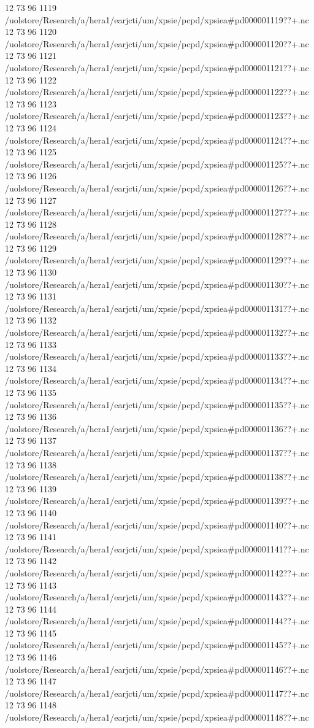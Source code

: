 12 73 96
1119
/uolstore/Research/a/hera1/earjcti/um/xpsie/pcpd/xpsiea#pd000001119??+.nc
12 73 96
1120
/uolstore/Research/a/hera1/earjcti/um/xpsie/pcpd/xpsiea#pd000001120??+.nc
12 73 96
1121
/uolstore/Research/a/hera1/earjcti/um/xpsie/pcpd/xpsiea#pd000001121??+.nc
12 73 96
1122
/uolstore/Research/a/hera1/earjcti/um/xpsie/pcpd/xpsiea#pd000001122??+.nc
12 73 96
1123
/uolstore/Research/a/hera1/earjcti/um/xpsie/pcpd/xpsiea#pd000001123??+.nc
12 73 96
1124
/uolstore/Research/a/hera1/earjcti/um/xpsie/pcpd/xpsiea#pd000001124??+.nc
12 73 96
1125
/uolstore/Research/a/hera1/earjcti/um/xpsie/pcpd/xpsiea#pd000001125??+.nc
12 73 96
1126
/uolstore/Research/a/hera1/earjcti/um/xpsie/pcpd/xpsiea#pd000001126??+.nc
12 73 96
1127
/uolstore/Research/a/hera1/earjcti/um/xpsie/pcpd/xpsiea#pd000001127??+.nc
12 73 96
1128
/uolstore/Research/a/hera1/earjcti/um/xpsie/pcpd/xpsiea#pd000001128??+.nc
12 73 96
1129
/uolstore/Research/a/hera1/earjcti/um/xpsie/pcpd/xpsiea#pd000001129??+.nc
12 73 96
1130
/uolstore/Research/a/hera1/earjcti/um/xpsie/pcpd/xpsiea#pd000001130??+.nc
12 73 96
1131
/uolstore/Research/a/hera1/earjcti/um/xpsie/pcpd/xpsiea#pd000001131??+.nc
12 73 96
1132
/uolstore/Research/a/hera1/earjcti/um/xpsie/pcpd/xpsiea#pd000001132??+.nc
12 73 96
1133
/uolstore/Research/a/hera1/earjcti/um/xpsie/pcpd/xpsiea#pd000001133??+.nc
12 73 96
1134
/uolstore/Research/a/hera1/earjcti/um/xpsie/pcpd/xpsiea#pd000001134??+.nc
12 73 96
1135
/uolstore/Research/a/hera1/earjcti/um/xpsie/pcpd/xpsiea#pd000001135??+.nc
12 73 96
1136
/uolstore/Research/a/hera1/earjcti/um/xpsie/pcpd/xpsiea#pd000001136??+.nc
12 73 96
1137
/uolstore/Research/a/hera1/earjcti/um/xpsie/pcpd/xpsiea#pd000001137??+.nc
12 73 96
1138
/uolstore/Research/a/hera1/earjcti/um/xpsie/pcpd/xpsiea#pd000001138??+.nc
12 73 96
1139
/uolstore/Research/a/hera1/earjcti/um/xpsie/pcpd/xpsiea#pd000001139??+.nc
12 73 96
1140
/uolstore/Research/a/hera1/earjcti/um/xpsie/pcpd/xpsiea#pd000001140??+.nc
12 73 96
1141
/uolstore/Research/a/hera1/earjcti/um/xpsie/pcpd/xpsiea#pd000001141??+.nc
12 73 96
1142
/uolstore/Research/a/hera1/earjcti/um/xpsie/pcpd/xpsiea#pd000001142??+.nc
12 73 96
1143
/uolstore/Research/a/hera1/earjcti/um/xpsie/pcpd/xpsiea#pd000001143??+.nc
12 73 96
1144
/uolstore/Research/a/hera1/earjcti/um/xpsie/pcpd/xpsiea#pd000001144??+.nc
12 73 96
1145
/uolstore/Research/a/hera1/earjcti/um/xpsie/pcpd/xpsiea#pd000001145??+.nc
12 73 96
1146
/uolstore/Research/a/hera1/earjcti/um/xpsie/pcpd/xpsiea#pd000001146??+.nc
12 73 96
1147
/uolstore/Research/a/hera1/earjcti/um/xpsie/pcpd/xpsiea#pd000001147??+.nc
12 73 96
1148
/uolstore/Research/a/hera1/earjcti/um/xpsie/pcpd/xpsiea#pd000001148??+.nc
